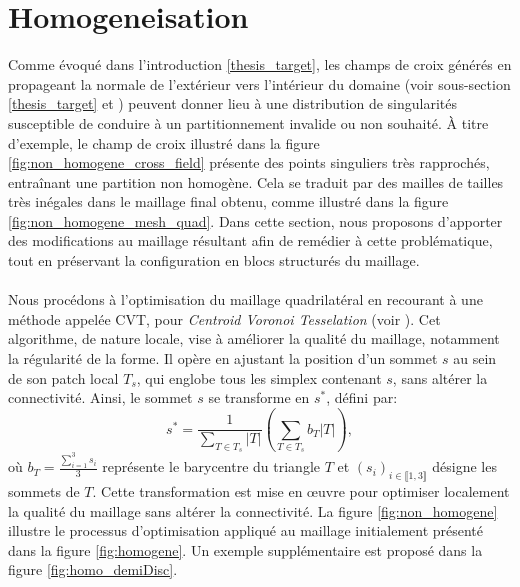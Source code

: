 \section{Homogeneisation}
\label{sec:Homogeneisation_algo}

Comme évoqué dans l'introduction \ref{thesis_target}, les champs de croix générés en propageant la normale de l'extérieur vers l'intérieur du domaine (voir sous-section \ref{thesis_target} et \cite{kowalski2013pde}) peuvent donner lieu à une distribution de singularités susceptible de conduire à un partitionnement invalide ou non souhaité. À titre d'exemple, le champ de croix illustré dans la figure \ref{fig:non_homogene_cross_field} présente des points singuliers très rapprochés, entraînant une partition non homogène. Cela se traduit par des mailles de tailles très inégales dans le maillage final obtenu, comme illustré dans la figure \ref{fig:non_homogene_mesh_quad}. Dans cette section, nous proposons d'apporter des modifications au maillage résultant afin de remédier à cette problématique, tout en préservant la configuration en blocs structurés du maillage.\\\\
Nous procédons à l'optimisation du maillage quadrilatéral en recourant à une méthode appelée CVT, pour \emph{Centroid Voronoi Tesselation} (voir \cite{chen2004mesh}). Cet algorithme, de nature locale, vise à améliorer la qualité du maillage, notamment la régularité de la forme. Il opère en ajustant la position d'un sommet $s$ au sein de son patch local $T_{s}$, qui englobe tous les simplex contenant $s$, sans altérer la connectivité. Ainsi, le sommet $s$ se transforme en $s^*$, défini par:
$$s^*=\displaystyle\frac{1}{\displaystyle\sum_{T\in T_s}|T|}\left(\displaystyle\sum_{T\in T_s}b_T|T|\right),$$
où $b_T=\frac{\sum_{i=1}^3s_i}{3}$ représente le barycentre du triangle $T$ et $(s_i)_{i\in\llbracket 1, 3\rrbracket}$ désigne les sommets de $T$. Cette transformation est mise en œuvre pour optimiser localement la qualité du maillage sans altérer la connectivité. La figure \ref{fig:non_homogene} illustre le processus d'optimisation appliqué au maillage initialement présenté dans la figure \ref{fig:homogene}. Un exemple supplémentaire est proposé dans la figure \ref{fig:homo_demiDisc}.

